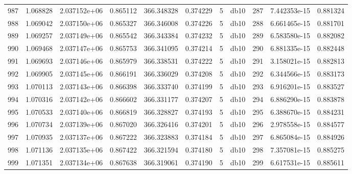 \begin{tabular}{lrrrrrrlrrr}
987  &    1.068828 &        2.037152e+06 &  0.865112 &              366.348328 &    0.374229 &       5 &         db10 &    287 &   7.442353e-15 &      0.881324 \\
988  &    1.069042 &        2.037150e+06 &  0.865327 &              366.346008 &    0.374226 &       5 &         db10 &    288 &   6.661465e-15 &      0.881701 \\
989  &    1.069257 &        2.037149e+06 &  0.865542 &              366.343384 &    0.374232 &       5 &         db10 &    289 &   6.583580e-15 &      0.882082 \\
990  &    1.069468 &        2.037147e+06 &  0.865753 &              366.341095 &    0.374214 &       5 &         db10 &    290 &   6.881335e-15 &      0.882448 \\
991  &    1.069693 &        2.037146e+06 &  0.865979 &              366.338531 &    0.374222 &       5 &         db10 &    291 &   3.158021e-15 &      0.882813 \\
992  &    1.069905 &        2.037145e+06 &  0.866191 &              366.336029 &    0.374208 &       5 &         db10 &    292 &   6.344566e-15 &      0.883173 \\
993  &    1.070113 &        2.037143e+06 &  0.866398 &              366.333740 &    0.374199 &       5 &         db10 &    293 &   6.916201e-15 &      0.883527 \\
994  &    1.070316 &        2.037142e+06 &  0.866602 &              366.331177 &    0.374207 &       5 &         db10 &    294 &   6.886290e-15 &      0.883878 \\
995  &    1.070533 &        2.037140e+06 &  0.866819 &              366.328827 &    0.374193 &       5 &         db10 &    295 &   6.388670e-15 &      0.884231 \\
996  &    1.070734 &        2.037139e+06 &  0.867020 &              366.326416 &    0.374201 &       5 &         db10 &    296 &   2.978558e-15 &      0.884577 \\
997  &    1.070935 &        2.037137e+06 &  0.867222 &              366.323883 &    0.374184 &       5 &         db10 &    297 &   6.865084e-15 &      0.884926 \\
998  &    1.071136 &        2.037135e+06 &  0.867422 &              366.321594 &    0.374180 &       5 &         db10 &    298 &   7.357081e-15 &      0.885275 \\
999  &    1.071351 &        2.037134e+06 &  0.867638 &              366.319061 &    0.374190 &       5 &         db10 &    299 &   6.617531e-15 &      0.885611 \\

\end{tabular}
